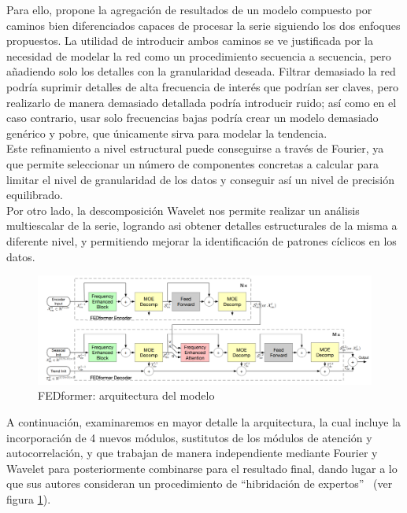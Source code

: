 Para ello, propone la agregación de resultados de un modelo compuesto por caminos bien diferenciados capaces de procesar la serie siguiendo los dos enfoques propuestos. La utilidad de introducir ambos caminos se ve justificada por la necesidad de modelar la red como un procedimiento secuencia a secuencia, pero añadiendo solo los detalles con la granularidad deseada. Filtrar demasiado la red podría suprimir detalles de alta frecuencia de interés que podrían ser claves, pero realizarlo de manera demasiado detallada podría introducir ruido; así como en el caso contrario, usar solo frecuencias bajas podría crear un modelo demasiado genérico y pobre, que únicamente sirva para modelar la tendencia.\\

Este refinamiento a nivel estructural puede conseguirse a través de Fourier, ya que permite seleccionar un número de componentes concretas a calcular para limitar el nivel de granularidad de los datos y conseguir así un nivel de precisión equilibrado.\\

Por otro lado, la descomposición Wavelet nos permite realizar un análisis multiescalar de la serie, logrando asi obtener detalles estructurales de la misma a diferente nivel, y permitiendo mejorar la identificación de patrones cíclicos en los datos.\\

\begin{figure}[!ht]
    \centering
    \includegraphics[scale=0.25]{img/fedformer.png}
    \caption{FEDformer: arquitectura del modelo \cite{zhou2022fedformerfrequencyenhanceddecomposed}}
    \label{fedformer}
\end{figure}


A continuación, examinaremos en mayor detalle la arquitectura, la cual incluye la incorporación de 4 nuevos módulos, sustitutos de los módulos de atención y autocorrelación, y que trabajan de manera independiente mediante Fourier y Wavelet para posteriormente combinarse para el resultado final, dando lugar a lo que sus autores consideran un procedimiento de ``hibridación de expertos''~\cite{zhou2022fedformerfrequencyenhanceddecomposed} (ver figura \ref{fedformer}).

